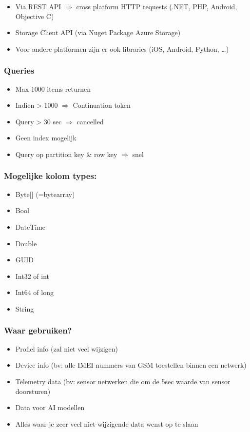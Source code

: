 \documentclass{article}
\begin{document}
\begin{itemize}
    \item Via REST API $\Rightarrow$ cross platform HTTP requests (.NET, PHP, Android, Objective C)
    \item Storage Client API (via Nuget Package Azure Storage)
    \item Voor andere platformen zijn er ook libraries (iOS, Android, Python, \dots)
\end{itemize}

\subsubsection{Queries}

\begin{itemize}
    \item Max 1000 items returnen
    \item Indien > 1000 $\Rightarrow$ Continuation token
    \item Query > 30 sec $\Rightarrow$ cancelled
    \item Geen index mogelijk
    \item Query op partition key \& row key $\Rightarrow$ snel
\end{itemize}

\subsubsection{Mogelijke kolom types: }

\begin{itemize}
    \item Byte[] (=bytearray)
    \item Bool
    \item DateTime
    \item Double
    \item GUID
    \item Int32 of int
    \item Int64 of long
    \item String
\end{itemize}

\subsubsection{Waar gebruiken?}

\begin{itemize}
    \item Profiel info (zal niet veel wijzigen)
    \item Device info (bv: alle IMEI nummers van GSM toestellen binnen een netwerk)
    \item Telemetry data (bv: sensor netwerken die om de 5sec waarde van sensor doorsturen)
    \item Data voor AI modellen
    \item Alles waar je zeer veel niet-wijzigende data wenst op te slaan
\end{itemize}
\end{document}
